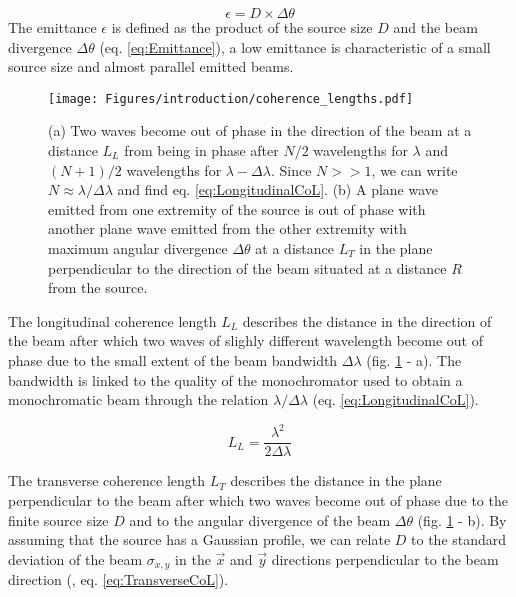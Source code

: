 \begin{equation}
    \label{eq:Emittance}
    \epsilon = D \times \Delta\theta
\end{equation}
The emittance $\epsilon$ is defined as the product of the source size $D$ and the beam divergence $\Delta\theta$ (eq. \ref{eq:Emittance}), a low emittance is characteristic of a small source size and almost parallel emitted beams.

\begin{figure}[!htb]
    \centering
    \texttt{[image: Figures/introduction/coherence\_lengths.pdf]}
    \caption{
    (a) Two waves become out of phase in the direction of the beam at a distance $L_L$ from being in phase after $N/2$ wavelengths for $\lambda$ and $(N+1)/2$ wavelengths for $\lambda - \Delta\lambda$. Since $N >> 1$, we can write $N\approx\lambda/\Delta\lambda$ and find eq. \ref{eq:LongitudinalCoL}.
    (b) A plane wave emitted from one extremity of the source is out of phase with another plane wave emitted from the other extremity with maximum angular divergence $\Delta\theta$ at a distance $L_T$ in the plane perpendicular to the direction of the beam situated at a distance $R$ from the source.
    }
    \label{fig:CoherenceLengths}
\end{figure}

The longitudinal coherence length $L_L$ describes the distance in the direction of the beam after which two waves of slighly different wavelength become out of phase due to the small extent of the beam bandwidth $\Delta\lambda$ (fig. \ref{fig:CoherenceLengths} - a).
The bandwidth is linked to the quality of the monochromator used to obtain a monochromatic beam through the relation $\lambda/\Delta\lambda$ (eq. \ref{eq:LongitudinalCoL}).

\begin{equation}
    \label{eq:LongitudinalCoL}
    L_L = \frac{\lambda^2}{2\Delta\lambda}
\end{equation}

The transverse coherence length $L_T$ describes the distance in the plane perpendicular to the beam after which two waves become out of phase due to the finite source size $D$ and to the angular divergence of the beam $\Delta\theta$ (fig. \ref{fig:CoherenceLengths} - b).
By assuming that the source has a Gaussian profile, we can relate $D$ to the standard deviation of the beam $\sigma_{x,y}$ in the $\vec{x}$ and $\vec{y}$ directions perpendicular to the beam direction (\cite{Willmott}, eq. \ref{eq:TransverseCoL}).

